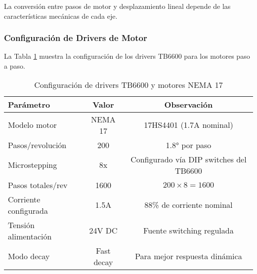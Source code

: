 La conversión entre pasos de motor y desplazamiento lineal depende de las características mecánicas de cada eje.

\subsubsection{Configuración de Drivers de Motor}

La Tabla \ref{tab:config_drivers} muestra la configuración de los drivers TB6600 para los motores paso a paso.

\begin{table}[H]
\centering
\caption{Configuración de drivers TB6600 y motores NEMA 17}
\label{tab:config_drivers}
\begin{tabular}{|l|c|c|}
\hline
\textbf{Parámetro} & \textbf{Valor} & \textbf{Observación} \\
\hline
Modelo motor & NEMA 17 & 17HS4401 (1.7A nominal) \\
\hline
Pasos/revolución & 200 & 1.8° por paso \\
\hline
Microstepping & 8x & Configurado vía DIP switches del TB6600 \\
\hline
Pasos totales/rev & 1600 & $200 \times 8 = 1600$ \\
\hline
Corriente configurada & 1.5A & 88\% de corriente nominal \\
\hline
Tensión alimentación & 24V DC & Fuente switching regulada \\
\hline
Modo decay & Fast decay & Para mejor respuesta dinámica \\
\hline
\end{tabular}
\end{table}
